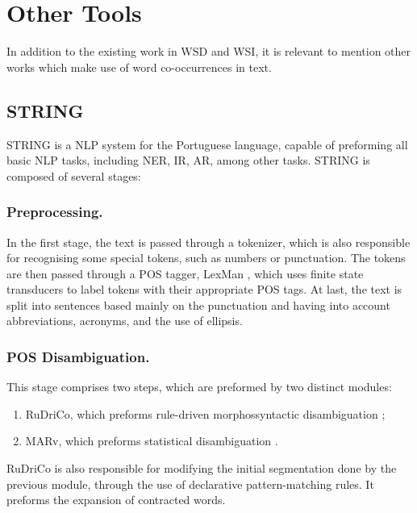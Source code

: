 \section{Other Tools}

In addition to the existing work in \ac{WSD} and \ac{WSI}, it is relevant to
mention other works which make use of word co-occurrences in text.

\subsection{STRING}
\label{sec:string}

\ac{STRING} \cite{mamede2012string} is a \ac{NLP} system for the Portuguese
language, capable of preforming all basic \ac{NLP} tasks, including \ac{NER},
\ac{IR}, \ac{AR}, among other tasks. \ac{STRING} is composed of several stages:

\subsubsection*{Preprocessing.}

In the first stage, the text is passed through a tokenizer, which is also
responsible for recognising some special tokens, such as numbers or punctuation.
The tokens are then passed through a \ac{POS} tagger, LexMan
\cite{vicente2013lexman}, which uses finite state transducers to label tokens
with their appropriate \ac{POS} tags. At last, the text is split into sentences
based mainly on the punctuation and having into account abbreviations, acronyms,
and the use of ellipsis.

\subsubsection*{POS Disambiguation.}

This stage comprises two steps, which are preformed by two distinct modules:

\begin{enumerate}
 \item \ac{RuDriCo}, which preforms rule-driven morphossyntactic disambiguation
\cite{diniz2010conversor};
 \item \ac{MARv}, which preforms statistical disambiguation
\cite{ribeiro2003anotacao}.
\end{enumerate}

\ac{RuDriCo} is also responsible for modifying the initial segmentation done by
the previous module, through the use of declarative pattern-matching rules. It
preforms the expansion of contracted words.

